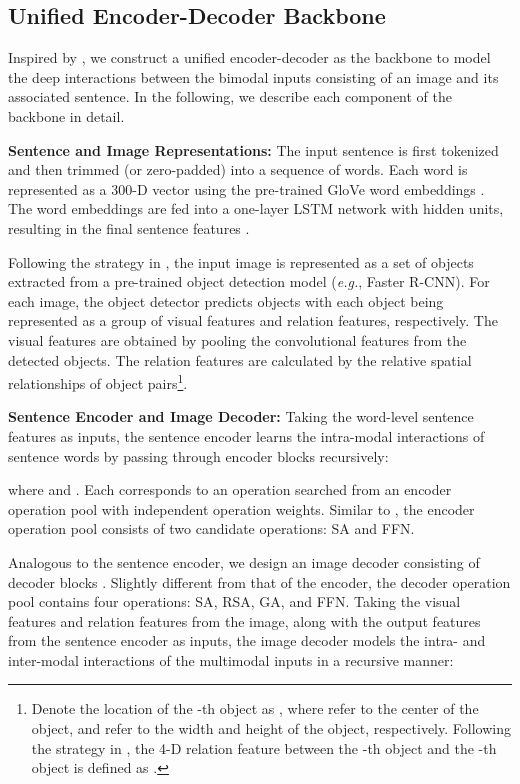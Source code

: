 \documentclass[sigconf]{acmart}
\begin{document}
\subsection{Unified Encoder-Decoder Backbone}\label{sec:uedb}
Inspired by \cite{yu2019mcan}, we construct a unified encoder-decoder as the backbone to model the deep interactions between the bimodal inputs consisting of an image and its associated sentence. In the following, we describe each component of the backbone in detail.

\noindent\textbf{Sentence and Image Representations:}
The input sentence is first tokenized and then trimmed (or zero-padded) into a sequence of  words. Each word is represented as a 300-D vector using the pre-trained GloVe word embeddings \cite{pennington2014glove}. The word embeddings are fed into a one-layer LSTM network with  hidden units, resulting in the final sentence features .

Following the strategy in \cite{anderson2017up-down}, the input image is represented as a set of objects extracted from a pre-trained object detection model (\emph{e.g.}, Faster R-CNN). For each image, the object detector predicts  objects with each object being represented as a group of visual features and relation features, respectively. The visual features  are obtained by pooling the convolutional features from the detected objects. The relation features  are calculated by the relative spatial relationships of object pairs\footnote{Denote the location of the -th object as , where  refer to the center of the object, and  refer to the width and height of the object, respectively. Following the strategy in \cite{hu2018relation}, the 4-D relation feature between the -th object and the -th object is defined as .}.

\noindent\textbf{Sentence Encoder and Image Decoder:}
Taking the word-level sentence features  as inputs, the sentence encoder learns the intra-modal interactions of sentence words by passing  through  encoder blocks  recursively:

where  and . Each  corresponds to an operation searched from an encoder operation pool with independent operation weights. Similar to \cite{yu2019mcan}, the encoder operation pool consists of two candidate operations: \textsf{SA} and \textsf{FFN}.

Analogous to the sentence encoder, we design an image decoder consisting of  decoder blocks . Slightly different from that of the encoder, the decoder operation pool contains four operations: \textsf{SA}, \textsf{RSA}, \textsf{GA}, and \textsf{FFN}. Taking the visual features  and relation features  from the image, along with the output features  from the sentence encoder as inputs, the image decoder models the intra- and inter-modal interactions of the multimodal inputs in a recursive manner:
\end{document}
